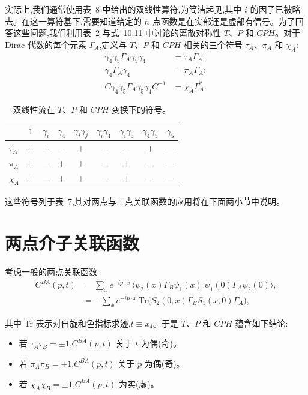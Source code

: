 实际上,我们通常使用表~8 中给出的双线性算符,为简洁起见,其中 $i$ 的因子已被略去。在这一算符基下,需要知道给定的 $n$ 点函数是在实部还是虚部有信号。为了回答这些问题,我们利用表~2 与式~10.11 中讨论的离散对称性 $T$、$P$ 和 $CPH$。对于 Dirac 代数的每个元素 $\Gamma_A$,定义与 $T$、$P$ 和 $CPH$ 相关的三个符号 $\tau_A$、$\pi_A$ 和 $\chi_A$:
\begin{equation}
\begin{aligned}
\gamma_4\gamma_5\Gamma_A\gamma_5\gamma_4 &= \tau_A\Gamma_A;\\
\gamma_4\Gamma_A\gamma_4 &= \pi_A\Gamma_A;\\
C\gamma_4\gamma_5\Gamma_A\gamma_5\gamma_4 C^{-1} &= \chi_A\Gamma_A^* .
\end{aligned}
\end{equation}

\begin{table}[htbp]
\centering
\begin{tabular}{lcccccccc}
\toprule
 & $1$ & $\gamma_i$ & $\gamma_4$ & $\gamma_i\gamma_j$ & $\gamma_i\gamma_4$ & $\gamma_i\gamma_5$ & $\gamma_4\gamma_5$ & $\gamma_5$ \\
\midrule
$\tau_A$ & $+$ & $+$ & $-$ & $+$ & $-$ & $-$ & $+$ & $-$ \\
$\pi_A$ & $+$ & $-$ & $+$ & $+$ & $-$ & $+$ & $-$ & $-$ \\
$\chi_A$ & $+$ & $-$ & $+$ & $+$ & $-$ & $+$ & $-$ & $-$ \\
\bottomrule
\end{tabular}
\caption{双线性流在 $T$、$P$ 和 $CPH$ 变换下的符号。}
\label{tab:7}
\end{table}

这些符号列于表~7,其对两点与三点关联函数的应用将在下面两小节中说明。

\section{两点介子关联函数}

考虑一般的两点关联函数
\begin{equation}
\begin{aligned}
C^{BA}(p,t) &= \sum_x e^{-ip\cdot x}\,
   \langle \bar{\psi}_2(x)\Gamma_B\psi_1(x)\;\bar{\psi}_1(0)\Gamma_A\psi_2(0)\rangle ,\\
&= -\sum_x e^{-ip\cdot x}\,
   \mathrm{Tr}\big(S_2(0,x)\Gamma_B S_1(x,0)\Gamma_A\big) ,
\end{aligned}
\end{equation}

其中 Tr 表示对自旋和色指标求迹,$t \equiv x_4$。于是 $T$、$P$ 和 $CPH$ 蕴含如下结论:
\begin{itemize}
\item 若 $\tau_A\tau_B = \pm 1$,$C^{BA}(p,t)$ 关于 $t$ 为偶(奇)。
\item 若 $\pi_A\pi_B = \pm 1$,$C^{BA}(p,t)$ 关于 $p$ 为偶(奇)。
\item 若 $\chi_A\chi_B = \pm 1$,$C^{BA}(p,t)$ 为实(虚)。
\end{itemize}

